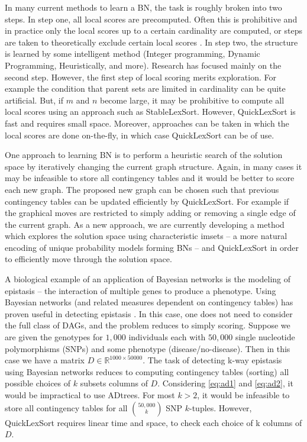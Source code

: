 \documentclass[a4paper,10pt,reqno]{amsart}
\newcommand\R{\mathbb R}
\theoremstyle{definition}
\begin{document}
In many current methods to learn a BN, the task is roughly broken into two
steps. In step one, all local scores are precomputed. Often this is prohibitive
and in practice only the local scores up to a certain cardinality are computed,
or steps are taken to theoretically exclude certain local scores
\cite{de2011efficient,de2009structure}.  In step two, the structure is
learned by some intelligent method (Integer programming, Dynamic Programming,
Heuristically, and more)\cite{de2011efficient,chickering2003optimal,de2009structure,de2000new,jaakkola2010learning,barlettadvances,cussens2012bayesian,silander2012simple,singh2005finding}. Research has focused mainly on the
second step. However, the first step of local scoring merits exploration. For
example the condition that parent sets are limited in cardinality can be quite
artificial. But, if $m$ and $n$ become large, it may be prohibitive to compute
all local scores using an approach such as StableLexSort. However, QuickLexSort
is fast and requires small space.  Moreover, approaches can be taken in which
the local scores are done on-the-fly, in which case QuickLexSort can be of use.

One approach to learning BN is to perform a heuristic search of the solution
space by iteratively changing the current graph
structure\cite{moore2003optimal,madigan1994model,madigan1995bayesian,giudici1999decomposable}. Again, in many cases it may be
infeasible to store all contingency tables and it would be better to score each
new graph. The proposed new graph can be chosen such that previous contingency
tables can be updated efficiently by QuickLexSort. For example if the graphical
moves are restricted to simply adding or removing a single edge of the current
graph.  As a new approach, we are currently developing a method which explores
the solution space using characteristic imsets\cite{hemmecke2012characteristic,studeny2010characteristic,studeny2011polyhedral,StudenyHaws:2013} -- a more natural encoding of unique probability models forming BNs --
and QuickLexSort in order to efficiently move through the solution space.

A biological example of an application of Bayesian networks is the modeling of epistasis --
the interaction of multiple genes to produce a phenotype. Using Bayesian
networks (and related measures dependent on contingency tables) has
proven useful in detecting epistasis
\cite{sucheston2010comparison,jiang2011learning,shang2011performance}.  In this
case, one does not need to consider the full class of DAGs, and the problem
reduces to simply scoring.  Suppose we are given the genotypes for $1,000$
individuals each with $50,000$ single nucleotide polymorphisms (SNPs) and some
phenotype (disease/no-disease). Then in this case we have a matrix $D \in
\R^{1000 \times 50000}$.  The task of detecting k-way epistasis using Bayesian
networks reduces to computing contingency tables (sorting) all possible choices
of $k$ subsets columns of $D$.  Considering \autoref{eq:ad1} and
\autoref{eq:ad2}, it would be impractical to use ADtrees.  For most $k>2$, it
would be infeasible to store all contingency tables for all $ 50,000 \choose k$
SNP $k$-tuples. However, QuickLexSort requires linear time and space, to check
each choice of k columns of $D$.
\end{document}
